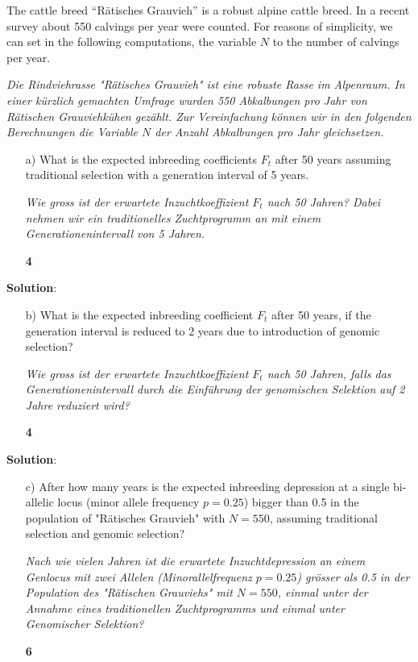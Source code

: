 \documentclass[
]{article}
\newcommand{\points}[1]
{\begin{flushright}\textbf{#1}\end{flushright}}
\newcommand{\solstart}
{\vspace{3ex}\textbf{Solution}:}
\begin{document}
\vspace{3ex}

The cattle breed ``Rätisches Grauvieh'' is a robust alpine cattle breed.
In a recent survey about 550 calvings per year were counted. For reasons
of simplicity, we can set in the following computations, the variable
\(N\) to the number of calvings per year.

\vspace{3ex}

\textit{Die Rindviehrasse "Rätisches Grauvieh" ist eine robuste Rasse im Alpenraum. In einer kürzlich gemachten Umfrage wurden 550 Abkalbungen pro Jahr von Rätischen Grauviehkühen gezählt. Zur Vereinfachung können wir in den folgenden Berechnungen die Variable $N$ der Anzahl Abkalbungen pro Jahr gleichsetzen.}

\vspace{3ex}
\begin{enumerate}
\item[a)] What is the expected inbreeding coefficients $F_t$ after 50 years assuming traditional selection with a generation interval of 5 years. 

\textit{Wie gross ist der erwartete Inzuchtkoeffizient $F_t$ nach 50 Jahren? Dabei nehmen wir ein traditionelles Zuchtprogramm an mit einem Generationenintervall von 5 Jahren.}
\points{4}
\end{enumerate}

\vspace{3ex}
\solstart

\clearpage
\pagebreak

\begin{enumerate}
\item[b)] What is the expected inbreeding coefficient $F_t$ after 50 years, if the generation interval is reduced to 2 years due to introduction of genomic selection?

\textit{Wie gross ist der erwartete Inzuchtkoeffizient $F_t$ nach 50 Jahren, falls das Generationenintervall durch die Einführung der genomischen Selektion auf 2 Jahre reduziert wird?}
\points{4}
\end{enumerate}

\vspace{3ex}
\solstart

\clearpage
\pagebreak

\begin{enumerate}
\item[c)] After how many years is the expected inbreeding depression at a single bi-allelic locus (minor allele frequency $p=0.25$) bigger than 0.5 in the population of "Rätisches Grauvieh" with $N = 550$, assuming traditional selection and genomic selection?

\textit{Nach wie vielen Jahren ist die erwartete Inzuchtdepression an einem Genlocus mit zwei Allelen (Minorallelfrequenz $p=0.25$) grösser als 0.5 in der Population des "Rätischen Grauviehs" mit $N = 550$, einmal unter der Annahme eines traditionellen Zuchtprogramms und einmal unter Genomischer Selektion?}
\points{6}
\end{enumerate}
\end{document}
